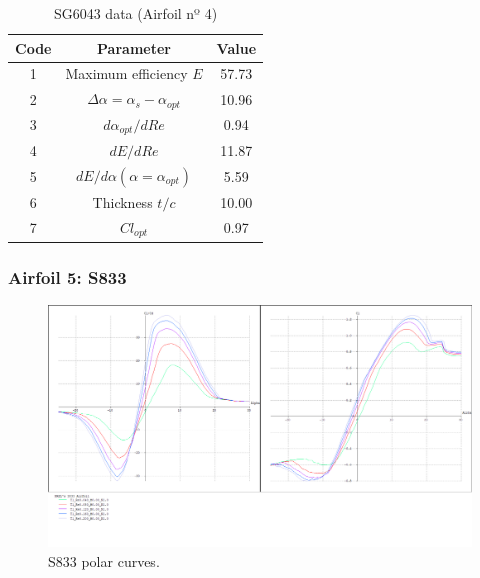 \documentclass[../TFG_Annex.tex]{subfiles}
\begin{document}
\begin{table}[h!]
	\centering
	\begin{tabular}{c|c|c}
Code & Parameter                                    & Value  \\ \hline
1    & Maximum efficiency $E$                      &       57.73             \\
2    & $\Delta \alpha=\alpha_{s}-\alpha_{opt}$    &           10.96          \\
3    & ${d\alpha_{opt}}/{dRe}$                     &               0.94     \\
4    & ${dE}/{dRe}$                                &        11.87            \\
5    & ${dE}/{d \alpha} (\alpha=\alpha_{opt})$      &           5.59        \\
6    & Thickness $t/c$                            &              10.00      \\
7    & $Cl_{opt}$  &   0.97
\end{tabular}
	\caption{SG6043 data (Airfoil nº 4)}
	\label{tab:Airf4}
\end{table}

\newpage
\subsubsection{Airfoil 5: S833}


\begin{figure}[h!]
	\centering
	\includegraphics[width=1\linewidth]{"../../04-Airfoil selection/Imatges airfoils/5-S833"}
	\caption{S833 polar curves.}
	\label{fig:5-s833}
\end{figure}
\end{document}

